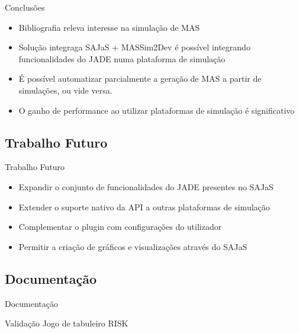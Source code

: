 
\begin{frame}{Conclusões}
	\begin{itemize}
		\item Bibliografia releva interesse na simulação de MAS
		\item Solução integraga SAJaS + MASSim2Dev é possível integrando funcionalidades do JADE numa plataforma de simulação
		\item É possível automatizar parcialmente a geração de MAS a partir de simulações, ou vide versa.
		\item O ganho de performance ao utilizar plataformas de simulação é significativo
	\end{itemize}
\end{frame}

\subsection{Trabalho Futuro}
\begin{frame}{Trabalho Futuro}
	\begin{itemize}
		\item Expandir o conjunto de funcionalidades do JADE presentes no SAJaS
		\item Extender o suporte nativo da API a outras plataformas de simulação
		\item Complementar o plugin com configurações do utilizador
		\item Permitir a criação de gráficos e visualizações através do SAJaS
	\end{itemize}
\end{frame}

\subsection{Documentação}
\begin{frame}{Documentação}

\end{frame}

\begin{frame}{Validação}
	Jogo de tabuleiro RISK

\end{frame}
